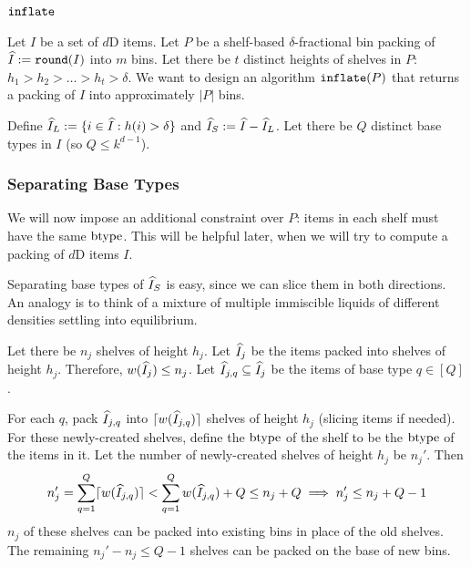 \subsection{\texorpdfstring{$\operatorname{\mathtt{inflate}}$}{inflate}}
\label{sec:hgap:inflate}

Let $I$ be a set of $d$D items. Let $P$ be a shelf-based $\delta$-fractional
bin packing of $\widehat{I} := \operatorname{\mathtt{round}}(I)$ into $m$ bins.
Let there be $t$ distinct heights of shelves in $P$: $h_1 > h_2 > \ldots > h_t > \delta$.
We want to design an algorithm $\operatorname{\mathtt{inflate}}(P)$ that returns a packing
of $I$ into approximately $|P|$ bins.

Define $\widehat{I}_L := \{i \in \widehat{I}: h(i) > \delta\}$ and $\widehat{I}_S := \widehat{I} - \widehat{I}_L$.
Let there be $Q$ distinct base types in $I$ (so $Q \le k^{d-1}$).

\subsubsection{Separating Base Types}
\label{sec:hgap:sep-btype}

We will now impose an additional constraint over $P$:
items in each shelf must have the same $\operatorname{btype}$.
This will be helpful later, when we will try to compute a packing of $d$D items $I$.

Separating base types of $\widehat{I}_S$ is easy, since we can slice them
in both directions. An analogy is to think of a mixture of
multiple immiscible liquids of different densities settling into equilibrium.

\begin{comment}
\begin{figure}[!ht]
\centering

\caption{Separating base types of $\Khat_S$ in a bin.
This example has 3 different base types in $\Khat_S$.}
\label{fig:split-base-small}
\end{figure}
\end{comment}

Let there be $n_j$ shelves of height $h_j$.
Let $\widehat{I}_j$ be the items packed into shelves of height $h_j$.
Therefore, $w(\widehat{I}_j) \le n_j$.
Let $\widehat{I}_{j,q} \subseteq \widehat{I}_j$ be the items of base type $q \in [Q]$.

For each $q$, pack $\widehat{I}_{j,q}$ into $\lceil w(\widehat{I}_{j,q}) \rceil$ shelves of height $h_j$
(slicing items if needed). For these newly-created shelves, define the $\operatorname{btype}$
of the shelf to be the $\operatorname{btype}$ of the items in it.
Let the number of newly-created shelves of height $h_j$ be $n_j'$. Then
\[ n_j' = \sum_{q=1}^Q \lceil w(\widehat{I}_{j,q}) \rceil
< \sum_{q=1}^Q w(\widehat{I}_{j,q}) + Q
\le n_j + Q \implies n_j' \le n_j + Q - 1 \]
$n_j$ of these shelves can be packed into existing bins in place of the old shelves.
The remaining $n_j' - n_j \le Q-1$ shelves can be packed on the base of new bins.

